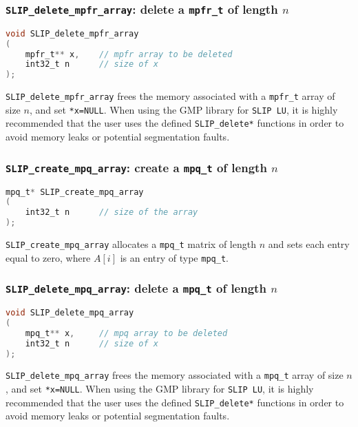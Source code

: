 \documentclass[11pt]{article}
\theoremstyle{definition}
\begin{document}
\cprotect\subsubsection{\verb|SLIP_delete_mpfr_array|: delete a \verb|mpfr_t| of length $n$}


\begin{lstlisting}[language=C,frame=single]
void SLIP_delete_mpfr_array
(
    mpfr_t** x,    // mpfr array to be deleted
    int32_t n      // size of x
);
\end{lstlisting}

\verb|SLIP_delete_mpfr_array| frees the memory associated with a \verb|mpfr_t| array of size $n$, and set \verb|*x=NULL|. When using the GMP library for \verb|SLIP LU|, it is highly recommended that the user uses the defined \verb|SLIP_delete*| functions in order to avoid memory leaks or potential segmentation faults.

\cprotect\subsubsection{\verb|SLIP_create_mpq_array|: create a \verb|mpq_t| of length $n$}


\begin{lstlisting}[language=C,frame=single]
mpq_t* SLIP_create_mpq_array
(
    int32_t n      // size of the array
);
\end{lstlisting}

\verb|SLIP_create_mpq_array| allocates a \verb|mpq_t| matrix of length $n$ and sets each entry equal to zero, where  $A[i]$ is an entry of type \verb|mpq_t|.

\cprotect\subsubsection{\verb|SLIP_delete_mpq_array|: delete a \verb|mpq_t| of length $n$}


\begin{lstlisting}[language=C,frame=single]
void SLIP_delete_mpq_array
(
    mpq_t** x,     // mpq array to be deleted
    int32_t n      // size of x
);
\end{lstlisting}

\verb|SLIP_delete_mpq_array| frees the memory associated with a \verb|mpq_t| array of size $n$, and set \verb|*x=NULL|. When using the GMP library for \verb|SLIP LU|, it is highly recommended that the user uses the defined \verb|SLIP_delete*| functions in order to avoid memory leaks or potential segmentation faults.
\end{document}
